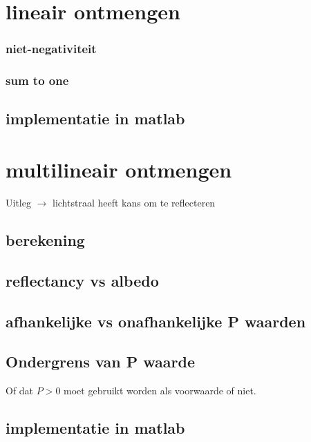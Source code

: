\documentclass[12pt]{report}
\begin{document}
\section{lineair ontmengen}




\subsubsection{niet-negativiteit}

\subsubsection{sum to one}



\subsection{implementatie in matlab}

\section{multilineair ontmengen}

Uitleg $\rightarrow$ lichtstraal heeft kans om te reflecteren

\subsection{berekening}

\subsection{reflectancy vs albedo}

\subsection{afhankelijke vs onafhankelijke P waarden}

\subsection{Ondergrens van P waarde}

Of dat $P > 0$ moet gebruikt worden als voorwaarde of niet.

\subsection{implementatie in matlab}
\end{document}
